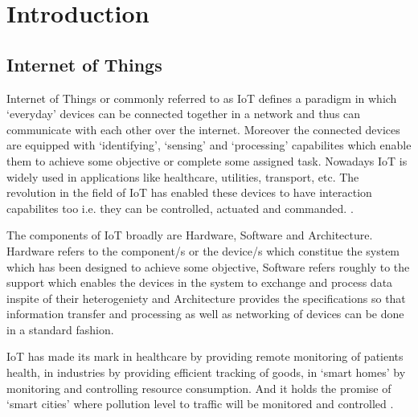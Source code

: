 \documentclass[12pt]{article}
\theoremstyle{definition}
\begin{document}
\section{Introduction}
  \subsection{Internet of Things}
  Internet of Things or commonly referred to as IoT defines a paradigm in which `everyday' devices can be connected 
  together in a network and thus can communicate with each other over the internet. Moreover the connected devices are equipped 
  with `identifying', `sensing' and `processing' \cite{Whitmore-survey}
  capabilites which enable them to 
  achieve some objective or complete some assigned task. Nowadays IoT is widely used in applications like
  healthcare, utilities, transport, etc. The revolution in the field of IoT has enabled
  these devices to have interaction capabilites too i.e. they can be controlled, actuated and commanded.
  \cite{Gubbi-vision}. 
  \par The components of IoT broadly are Hardware, Software and Architecture. Hardware refers to the component/s
  or the device/s which constitue the system which has been designed to achieve some objective, Software refers roughly
  to the support which enables the devices in the system to exchange and process data inspite of their heterogeniety 
   and Architecture provides the specifications so that information transfer and processing
   as well as networking of devices can be done in a standard fashion.
   \par IoT has made its mark in healthcare by providing remote monitoring of patients health, in industries 
   by providing efficient tracking of goods, in `smart homes' by monitoring and controlling resource consumption.
   And it holds the promise of `smart cities' where pollution level to traffic will be monitored and controlled
   \cite{Whitmore-survey} \cite{Gubbi-vision}.
\end{document}
